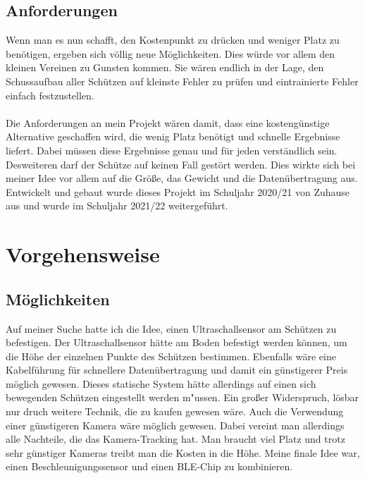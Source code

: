 \subsection{Anforderungen}
Wenn man es nun schafft, den Kostenpunkt zu drücken und weniger Platz zu benötigen,
ergeben sich völlig neue Möglichkeiten. Dies würde vor allem den kleinen Vereinen zu Gunsten 
kommen. Sie wären endlich in der Lage, den Schussaufbau aller Schützen auf kleinste Fehler 
zu prüfen und eintrainierte Fehler einfach festzustellen.\\
\\
Die Anforderungen an mein Projekt wären damit, dass eine kostengünstige Alternative 
geschaffen wird, die wenig Platz benötigt und schnelle Ergebnisse liefert. Dabei müssen diese 
Ergebnisse genau und für jeden verständlich sein.\\
Desweiteren darf der Schütze auf keinen Fall gestört werden.
Dies wirkte sich bei meiner Idee vor allem auf die Größe, das Gewicht und die 
Datenübertragung aus.\\
Entwickelt und gebaut wurde dieses Projekt im Schuljahr 2020/21 von Zuhause aus und wurde 
im Schuljahr 2021/22 weitergeführt.

\section{Vorgehensweise}
\subsection{Möglichkeiten}
Auf meiner Suche hatte ich die Idee, einen Ultraschallsensor am Schützen zu befestigen. Der 
Ultraschallsensor hätte am Boden befestigt werden können, um die Höhe der einzelnen 
Punkte des Schützen bestimmen. Ebenfalls wäre eine Kabelführung für schnellere 
Datenübertragung und damit ein günstigerer Preis möglich gewesen. Dieses statische System
hätte allerdings auf einen sich bewegenden Schützen eingestellt werden m"ussen. Ein großer Widerspruch,
lösbar nur druch weitere Technik, die zu kaufen gewesen wäre.
Auch die Verwendung einer günstigeren Kamera wäre möglich gewesen. Dabei vereint man 
allerdings alle Nachteile, die das Kamera-Tracking hat. Man braucht viel Platz und trotz sehr 
günstiger Kameras treibt man die Kosten in die Höhe.
Meine finale Idee war, einen Beschleunigungssensor und einen BLE-Chip zu kombinieren.

%

